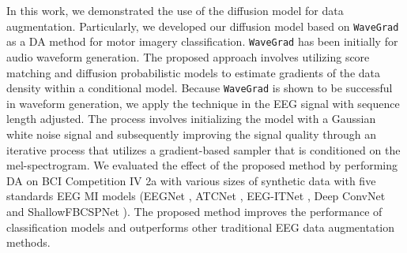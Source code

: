 In this work, we demonstrated the use of the diffusion model for data augmentation.
Particularly, we developed our diffusion model based on \texttt{WaveGrad} \cite{chen2020wavegrad} as a DA method for motor imagery classification.
\texttt{WaveGrad} has been initially for audio waveform generation.
The proposed approach involves utilizing score matching \cite{song2020sliced, song2020improved} and diffusion probabilistic \cite{sohl2015deep, ho2020denoising} models to estimate gradients of the data density within a conditional model. 
Because \texttt{WaveGrad} is shown to be successful in waveform generation, we apply the technique in the EEG signal with sequence length adjusted.
The process involves initializing the model with a Gaussian white noise signal and subsequently improving the signal quality through an iterative process that utilizes a gradient-based sampler that is conditioned on the mel-spectrogram.
We evaluated the effect of the proposed method by performing DA on BCI Competition IV 2a \cite{brunner2008bci} with various sizes of synthetic data with five standards EEG MI models (EEGNet \cite{lawhern2018eegnet}, ATCNet \cite{altaheri2022physics}, EEG-ITNet \cite{salami2022eeg}, Deep ConvNet \cite{schirrmeister2017deep} and ShallowFBCSPNet \cite{schirrmeister2017deep}). 
The proposed method improves the performance of classification models and outperforms other traditional EEG data augmentation methods. 

